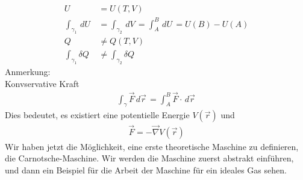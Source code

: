 \documentclass[11pt]{article}
\theoremstyle{plain}
\theoremstyle{mytheoremstyle}
\renewcommand{\d}[1]{\,d#1\,}
\begin{document}
  \begin{align*}
    U & = U(T,V) \\
      \int_{\gamma_1}^{} \d{U} & = \int_{\gamma_2}^{} \d{V} = 
      \int_{A}^{B} \d{U} = U(B)-U(A)\\
      Q  & \neq Q(T, V) \\
      \int_{\gamma_1}^{} \delta Q & \neq \int_{\gamma_2}^{} \delta Q
  \end{align*}
Anmerkung: \\
Konvservative Kraft
%
\begin{align*}
  \int_{\gamma}^{} \vec{F} \d{\vec{r}} = \int_{A}^{B} \vec{F} \cdot \d{\vec{r}}
\end{align*}
%
Dies bedeutet, es existiert eine potentielle Energie $V(\vec{r})$ und
%
\begin{align*}
  \vec{F} = - \vec{\nabla} V(\vec{r}) 
\end{align*}
%
Wir haben jetzt die M\"oglichkeit, eine erste theoretische Maschine zu definieren,
die Carnotsche-Maschine. Wir werden die Maschine zuerst abstrakt einf\"uhren, 
und dann ein Beispiel f\"ur die Arbeit der Maschine f\"ur ein ideales Gas sehen.
\end{document}

